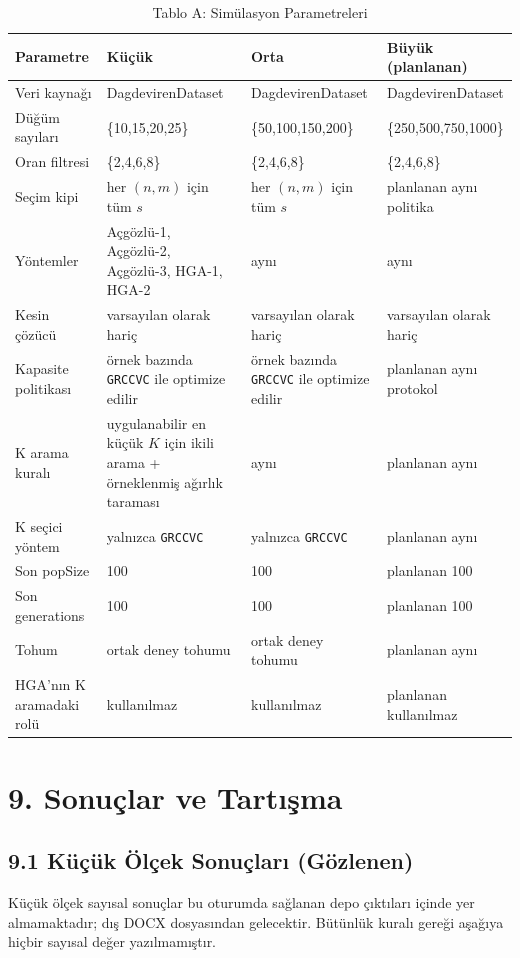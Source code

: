 \documentclass[11pt]{article}
\begin{document}
\begin{table}[h]
\centering
\caption{Tablo A: Simülasyon Parametreleri}
\label{tab:sim-params-tr}
\begin{tabular}{p{3.0cm}p{3.1cm}p{3.1cm}p{3.1cm}}
\toprule
Parametre & Küçük & Orta & Büyük (planlanan) \\
\midrule
Veri kaynağı & DagdevirenDataset & DagdevirenDataset & DagdevirenDataset \\
Düğüm sayıları & \{10,15,20,25\} & \{50,100,150,200\} & \{250,500,750,1000\} \\
Oran filtresi & \{2,4,6,8\} & \{2,4,6,8\} & \{2,4,6,8\} \\
Seçim kipi & her \((n,m)\) için tüm \(s\) & her \((n,m)\) için tüm \(s\) & planlanan aynı politika \\
Yöntemler & Açgözlü-1, Açgözlü-2, Açgözlü-3, HGA-1, HGA-2 & aynı & aynı \\
Kesin çözücü & varsayılan olarak hariç & varsayılan olarak hariç & varsayılan olarak hariç \\
Kapasite politikası & örnek bazında \texttt{GRCCVC} ile optimize edilir & örnek bazında \texttt{GRCCVC} ile optimize edilir & planlanan aynı protokol \\
K arama kuralı & uygulanabilir en küçük \(K\) için ikili arama + örneklenmiş ağırlık taraması & aynı & planlanan aynı \\
K seçici yöntem & yalnızca \texttt{GRCCVC} & yalnızca \texttt{GRCCVC} & planlanan aynı \\
Son popSize & 100 & 100 & planlanan 100 \\
Son generations & 100 & 100 & planlanan 100 \\
Tohum & ortak deney tohumu & ortak deney tohumu & planlanan aynı \\
HGA'nın K aramadaki rolü & kullanılmaz & kullanılmaz & planlanan kullanılmaz \\
\bottomrule
\end{tabular}
\end{table}

\section*{9. Sonuçlar ve Tartışma}

\subsection*{9.1 Küçük Ölçek Sonuçları (Gözlenen)}

Küçük ölçek sayısal sonuçlar bu oturumda sağlanan depo çıktıları içinde yer almamaktadır; dış DOCX dosyasından gelecektir. Bütünlük kuralı gereği aşağıya hiçbir sayısal değer yazılmamıştır.
\end{document}
